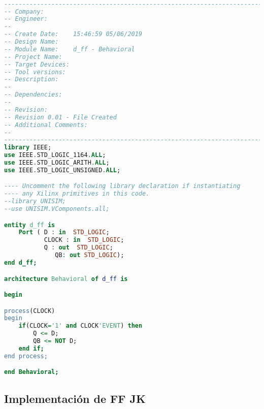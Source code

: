 \documentclass{mylib/reporteConCalif}
\begin{document}
\begin{lstlisting}[language=VHDL]

----------------------------------------------------------------------------------
-- Company:
-- Engineer:
--
-- Create Date:    15:46:59 05/06/2019
-- Design Name:
-- Module Name:    d_ff - Behavioral
-- Project Name:
-- Target Devices:
-- Tool versions:
-- Description:
--
-- Dependencies:
--
-- Revision:
-- Revision 0.01 - File Created
-- Additional Comments:
--
----------------------------------------------------------------------------------
library IEEE;
use IEEE.STD_LOGIC_1164.ALL;
use IEEE.STD_LOGIC_ARITH.ALL;
use IEEE.STD_LOGIC_UNSIGNED.ALL;

---- Uncomment the following library declaration if instantiating
---- any Xilinx primitives in this code.
--library UNISIM;
--use UNISIM.VComponents.all;

entity d_ff is
    Port ( D : in  STD_LOGIC;
           CLOCK : in  STD_LOGIC;
           Q : out  STD_LOGIC;
			  QB: out STD_LOGIC);
end d_ff;

architecture Behavioral of d_ff is

begin

process(CLOCK)
begin
	if(CLOCK='1' and CLOCK'EVENT) then
		Q <= D;
		QB <= NOT D;
	end if;
end process;

end Behavioral;

\end{lstlisting}


\subsection{Implementación de FF JK}
\end{document}
